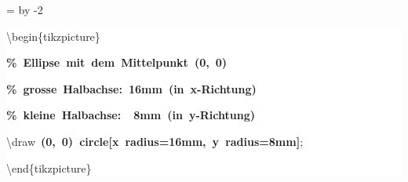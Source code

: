 \begingroup
\ttfamily
{}
=\textwidth
\advance{} by -2\fboxsep
\noindent
\colorbox{background}
{%
\parbox{\dimen255}
{%
\rule[-0.5ex]{0pt}{2.5ex}\hspace*{0.0em}\textbackslash{}begin\{tikzpicture\}\\
\rule[-0.5ex]{0pt}{2.5ex}\hspace*{1.0em}\textcolor{G}{\textbf{\%~Ellipse~mit~dem~Mittelpunkt~(0,~0)}}\\
\rule[-0.5ex]{0pt}{2.5ex}\hspace*{1.0em}\textcolor{G}{\textbf{\%~grosse~Halbachse:~16mm~(in~x{-}Richtung)}}\\
\rule[-0.5ex]{0pt}{2.5ex}\hspace*{1.0em}\textcolor{G}{\textbf{\%~kleine~Halbachse:~~8mm~(in~y{-}Richtung)}}\\
\rule[-0.5ex]{0pt}{2.5ex}\hspace*{1.0em}\textbackslash{}draw~\textcolor{R}{\textbf{(0,~0)~circle[x~radius=16mm,~y~radius=8mm]}};\\
\rule[-0.5ex]{0pt}{2.5ex}\hspace*{0.0em}\textbackslash{}end\{tikzpicture\}}%
}%
\endgroup
